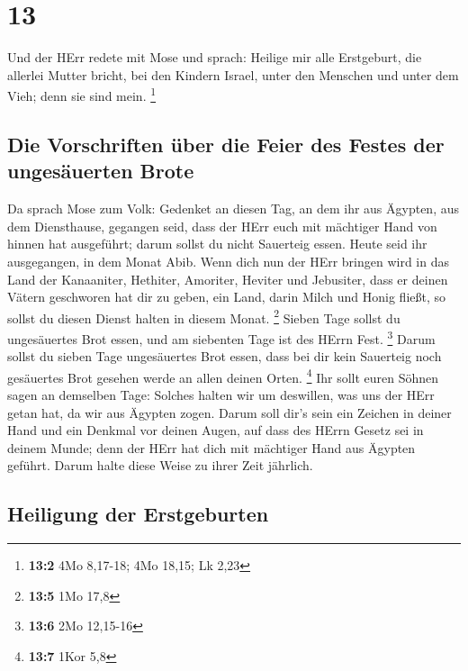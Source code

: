 \hypertarget{section-12}{%
\section{13}\label{section-12}}

 Und der HErr redete mit Mose und sprach: 
Heilige mir alle Erstgeburt, die allerlei Mutter bricht, bei den Kindern
Israel, unter den Menschen und unter dem Vieh; denn sie sind mein.
\footnote{\textbf{13:2} 4Mo 8,17-18; 4Mo 18,15; Lk 2,23}

\hypertarget{die-vorschriften-uxfcber-die-feier-des-festes-der-ungesuxe4uerten-brote}{%
\subsection{Die Vorschriften über die Feier des Festes der ungesäuerten
Brote}\label{die-vorschriften-uxfcber-die-feier-des-festes-der-ungesuxe4uerten-brote}}

 Da sprach Mose zum Volk: Gedenket an diesen Tag, an dem
ihr aus Ägypten, aus dem Diensthause, gegangen seid, dass der HErr euch
mit mächtiger Hand von hinnen hat ausgeführt; darum sollst du nicht
Sauerteig essen.  Heute seid ihr ausgegangen, in dem Monat
Abib.  Wenn dich nun der HErr bringen wird in das Land der
Kanaaniter, Hethiter, Amoriter, Heviter und Jebusiter, dass er deinen
Vätern geschworen hat dir zu geben, ein Land, darin Milch und Honig
fließt, so sollst du diesen Dienst halten in diesem Monat. \footnote{\textbf{13:5}
  1Mo 17,8}  Sieben Tage sollst du ungesäuertes Brot
essen, und am siebenten Tage ist des HErrn Fest. \footnote{\textbf{13:6}
  2Mo 12,15-16}  Darum sollst du sieben Tage ungesäuertes
Brot essen, dass bei dir kein Sauerteig noch gesäuertes Brot gesehen
werde an allen deinen Orten. \footnote{\textbf{13:7} 1Kor 5,8}
 Ihr sollt euren Söhnen sagen an demselben Tage: Solches
halten wir um deswillen, was uns der HErr getan hat, da wir aus Ägypten
zogen.  Darum soll dir's sein ein Zeichen in deiner Hand
und ein Denkmal vor deinen Augen, auf dass des HErrn Gesetz sei in
deinem Munde; denn der HErr hat dich mit mächtiger Hand aus Ägypten
geführt.  Darum halte diese Weise zu ihrer Zeit jährlich.

\hypertarget{heiligung-der-erstgeburten}{%
\subsection{Heiligung der
Erstgeburten}\label{heiligung-der-erstgeburten}}

